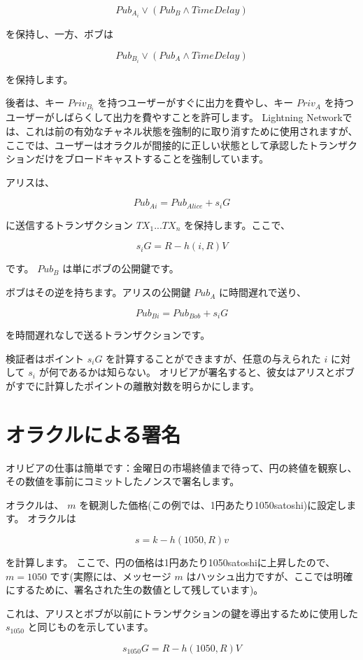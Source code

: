 \documentclass[11pt]{article}
\begin{document}
\[Pub_{A_i} \lor (Pub_{B} \land TimeDelay)\]

を保持し、一方、ボブは

\[Pub_{B_i} \lor (Pub_{A} \land TimeDelay)\]

を保持します。

後者は、キー \(Priv_{B_i}\) を持つユーザーがすぐに出力を費やし、キー \(Priv_{A}\) を持つユーザーがしばらくして出力を費やすことを許可します。 Lightning Networkでは、これは前の有効なチャネル状態を強制的に取り消すために使用されますが、ここでは、ユーザーはオラクルが間接的に正しい状態として承認したトランザクションだけをブロードキャストすることを強制しています。

アリスは、

\[Pub_{Ai} = Pub_{Alice} + s_iG\]

に送信するトランザクション \(TX_{1} ... TX_{n}\) を保持します。ここで、

\[s_iG = R - h(i, R)V\]

です。 \(Pub_B\) は単にボブの公開鍵です。

ボブはその逆を持ちます。アリスの公開鍵 \(Pub_A\) に時間遅れで送り、

\[Pub_{Bi} = Pub_{Bob} + s_iG\]

を時間遅れなしで送るトランザクションです。

検証者はポイント \(s_iG\) を計算することができますが、任意の与えられた \(i\) に対して \(s_i\) が何であるかは知らない。 オリビアが署名すると、彼女はアリスとボブがすでに計算したポイントの離散対数を明らかにします。

\section*{オラクルによる署名}

オリビアの仕事は簡単です：金曜日の市場終値まで待って、円の終値を観察し、その数値を事前にコミットしたノンスで署名します。

オラクルは、 \(m\) を観測した価格(この例では、1円あたり1050satoshi)に設定します。 オラクルは

\[s = k - h(1050, R)v\]

を計算します。 ここで、円の価格は1円あたり1050satoshiに上昇したので、 \(m = 1050\) です(実際には、メッセージ \(m\) はハッシュ出力ですが、ここでは明確にするために、署名された生の数値として残しています)。

これは、アリスとボブが以前にトランザクションの鍵を導出するために使用した \(s_{1050}\) と同じものを示しています。

\[s_{1050}G = R - h(1050, R)V\]
\end{document}
